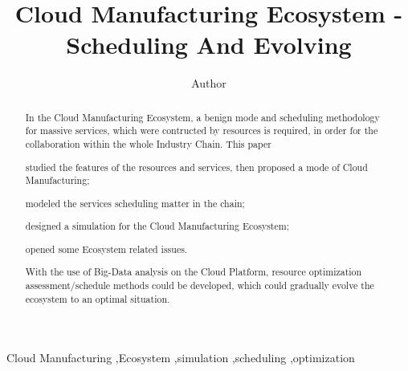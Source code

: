 
\title{Cloud Manufacturing Ecosystem - Scheduling And Evolving}

\author[label1]{Author}
\address[label1]{ZJU}
\begin{abstract}
In the Cloud Manufacturing Ecosystem, a benign mode and scheduling methodology for massive services, which were contructed by resources is required, in order for the collaboration within the whole Industry Chain.
This paper 
\begin{inparaenum}[1)]
\item studied the features of the resources and services, then proposed a mode of Cloud Manufacturing;
\item modeled the services scheduling matter in the chain;
\item designed a simulation for the Cloud Manufacturing Ecosystem;
\item opened some Ecosystem related issues. 
\end{inparaenum}
With the use of Big-Data analysis on the Cloud Platform, resource optimization assessment/schedule methods could be developed, which could
gradually evolve the ecosystem to an optimal situation.

\end{abstract}

\begin{keyword}
Cloud Manufacturing \sep Ecosystem \sep simulation \sep scheduling \sep optimization
\end{keyword}
